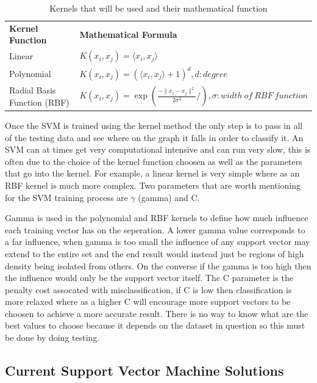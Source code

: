 \begin{table}[h]
	\centering
	\label{tab:kernels}
	\begin{tabular}{|p{1.5in}|p{4.5in}|}
	\hline
		\textbf{Kernel Function} & \textbf{Mathematical Formula}\\
	\hhline{|=|=|}
		Linear  & $K(x_{i},x_{j}) = \langle x_{i},x_{j}\rangle$ \\
	\hline
		Polynomial & $K(x_{i},x_{j}) = (\langle x_{i},x_{j}\rangle + 1)^d, d: degree$ \\
	\hline
		Radial Basis Function (RBF) & $K(x_{i},x_{j}) = \exp\left(\frac{- \parallel x_i - x_j \parallel^2}{2\sigma^2} /\right), \sigma : width\ of\ RBF\ function$ \\
	\hline
	\end{tabular}
	\caption{Kernels that will be used and their mathematical function} %
\end{table}

Once the SVM is trained using the kernel method the only step is to pass in all of the testing data and see where on the graph it falls in order to classify it.  An SVM can at times get very computational intensive and can run very slow, this is often due to the choice of the kernel function choosen as well as the parameters that go into the kernel.  For example, a linear kernel is very simple where as an RBF kernel is much more complex.  Two parameters that are worth mentioning for the SVM training process are $\gamma$ (gamma) and C.

Gamma is used in the polynomial and RBF kernels to define how much influence each training vector has on the seperation.  A lower gamma value corresponds to a far influence, when gamma is too small the influence of any support vector may extend to the entire set and the end result would instead just be regions of high density being isolated from others.  On the converse if the gamma is too high then the influence would only be the support vector itself.  The C parameter is the penalty cost assocated with misclassification, if C is low then classification is more relaxed where as a higher C will encourage more support vectors to be choosen to achieve a more accurate result.  %
There is no way to know what are the best values to choose because it depends on the dataset in question so this must be done by doing testing.

\subsection{Current Support Vector Machine Solutions}

